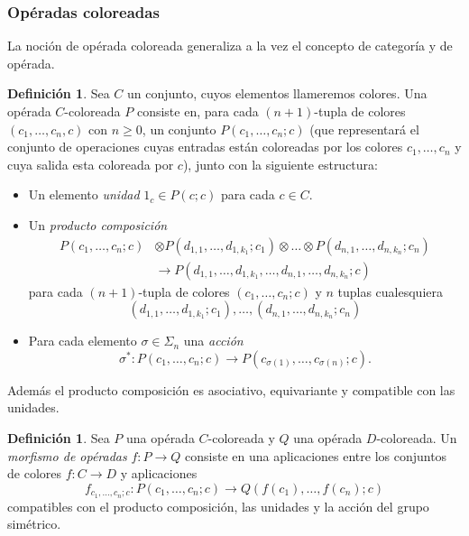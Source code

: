 \documentclass[11pt,a4paper,openright,oneside]{article}
\numberwithin{equation}{section}
\theoremstyle{definition}
\newtheorem{defi}[teo]{Definici\'on}
\begin{document}
\subsubsection{Op\'eradas coloreadas}
La noci\'on de op\'erada coloreada generaliza a la vez el concepto de categor{\'i}a y de op\'erada.
\begin{defi}
    Sea $C$ un conjunto, cuyos elementos llameremos colores. Una op\'erada $C$-coloreada $P$ consiste en, para cada $(n+1)$-tupla de colores $(c_1,\ldots,c_n,c)$ con $n\ge 0$, un conjunto $P(c_1,\ldots, c_n;c)$ (que representar\'a el conjunto de operaciones cuyas entradas est\'an coloreadas por los colores $c_1,\ldots, c_n$ y cuya salida esta coloreada por $c$), junto con la siguiente estructura:
    \begin{itemize}
        \item Un elemento \emph{unidad} $1_c\in P(c;c)$ para cada $c\in C$.
        \item Un \emph{producto composici\'on}
              \begin{align*}
                  P(c_1,\dots,c_n;c) & \otimes P(d_{1,1},\dots,d_{1,k_1};c_1) \otimes\dots\otimes P(d_{n,1},\dots,d_{n,k_n};c_n) \\
                                     & \longrightarrow P(d_{1,1},\dots,d_{1,k_1},\dots,d_{n,1},\dots,d_{n,k_n};c)
              \end{align*}
              para cada $(n+1)$-tupla de colores $(c_1,\dots,c_n;c)$ y $n$ tuplas cualesquiera
              $$
                  (d_{1,1},\dots,d_{1,k_1};c_1),\dots,(d_{n,1},\dots,d_{n,k_n};c_n)
              $$
        \item Para cada elemento $\sigma\in\Sigma_n$ una \emph{acci\'on}
              $$
                  \sigma^{*}: P(c_1,\dots,c_n;c) \longrightarrow P(c_{\sigma(1)},\dots,c_{\sigma(n)};c).
              $$
    \end{itemize}
    Adem\'as el producto composici\'on es asociativo, equivariante y compatible con las unidades.
\end{defi}

\begin{defi}
    Sea $P$ una op\'erada $C$-coloreada y $Q$ una op\'erada $D$-coloreada. Un \emph{morfismo de op\'eradas} $f\colon P\to Q$ consiste en una aplicaciones entre los conjuntos de colores $f\colon C\to D$ y aplicaciones
    $$
        f_{c_1,\dots,c_n;c}: P(c_1,\dots,c_n;c) \longrightarrow Q(f(c_1),\dots,f(c_n);c)
    $$
    compatibles con el producto composici\'on, las unidades y la acci\'on del grupo sim\'etrico.
\end{defi}
\end{document}
